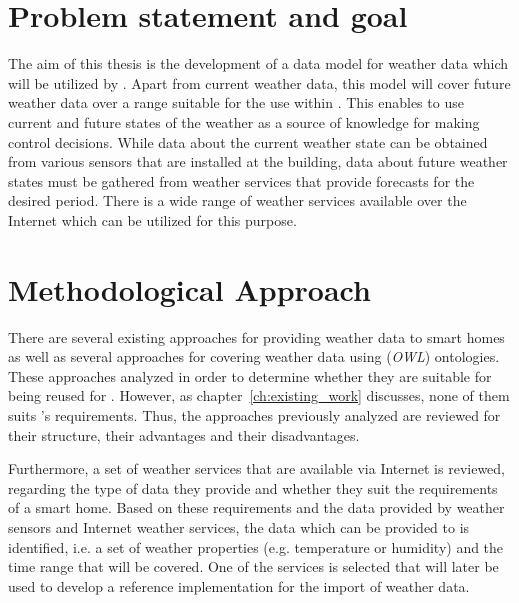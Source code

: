 \section{Problem statement and goal}

The aim of this thesis is the development of a data model for weather data which will be utilized by \thinkhome. Apart from current weather data, this model will cover future weather data over a range suitable for the use within \thinkhome. This enables \thinkhome to use current and future states of the weather as a source of knowledge for making control decisions. While data about the current weather state can be obtained from various sensors that are installed at the building, data about future weather states must be gathered from weather services that provide forecasts for the desired period. There is a wide range of weather services available over the Internet which can be utilized for this purpose.


\section{Methodological Approach}

There are several existing approaches for providing weather data to smart homes as well as several approaches for covering weather data using (\emph{OWL}) ontologies. These approaches analyzed in order to determine whether they are suitable for being reused for \thinkhome. However, as chapter~\ref{ch:existing_work} discusses, none of them suits \thinkhome's requirements. Thus, the approaches previously analyzed are reviewed for their structure, their advantages and their disadvantages.

Furthermore, a set of weather services that are available via Internet is reviewed, regarding the type of data they provide and whether they suit the requirements of a smart home. Based on these requirements and the data provided by weather sensors and Internet weather services, the data which can be provided to \thinkhome is identified, i.e. a set of weather properties (e.g. temperature or humidity) and the time range that will be covered. One of the services is selected that will later be used to develop a reference implementation for the import of weather data.




